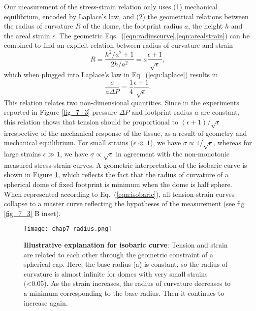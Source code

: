 Our measurement of the stress-strain relation only uses (1) mechanical equilibrium, encoded by Laplace's law, and (2) the geometrical relations between the radius of curvature $R$ of the dome, the footprint radius $a$, the height $h$ and the areal strain $\epsilon$. The geometric Eqs.~(\ref{eqn:radiuscurve},\ref{eqn:arealstrain}) can be combined to find an explicit relation between radius of curvature and strain
\begin{equation}
	R = \frac{h^2/a^2 + 1}{2h/a^2} = a\frac{\epsilon + 1}{\sqrt{\epsilon}},
\end{equation}
which when plugged into Laplace's law in Eq.~(\ref{eqn:laplace}) results in 
\begin{equation}
	\label{eqn:isobaric}
	\frac{\sigma}{a \Delta P} = \frac{1}{4}  \frac{\epsilon + 1}{\sqrt{\epsilon}}.
\end{equation}
This relation relates two non-dimensional quantities. Since in the experiments reported in Figure \ref{fig_7_3} pressure $\Delta P$ and footprint radius $a$ are constant, this relation shows that tension should be proportional to $(\epsilon + 1)/\sqrt{\epsilon}$ irrespective of the mechanical response of the tissue, as a result of geometry and mechanical equilibrium. For small strains ($\epsilon\ll 1$), we have $\sigma \propto 1/\sqrt{\epsilon}$, whereas for large strains $\epsilon\gg 1$, we have $\sigma \propto \sqrt{\epsilon}$ in agreement with the non-monotonic measured stress-strain curves. A geometric interpretation of the isobaric curve is shown in Figure \ref{fig_7_4}, which reflects the fact that the radius of curvature of a spherical dome of fixed footprint is minimum when the dome is half sphere. When represented according to Eq.~(\ref{eqn:isobaric}), all tension-strain curves collapse to a master curve reflecting the hypotheses of the measurement (see fig \ref{fig_7_3} B inset).

\begin{figure}
	\centering
	\texttt{[image: chap7\_radius.png]}
	\caption{\label{fig_7_4} \textbf{Illustrative explanation for isobaric curve}: Tension and strain are related to each other through the geometric constraint of a spherical cap. Here, the base radius (a) is constant, so the radius of curvature is almost infinite for domes with very small strains (<0.05). As the strain increases, the radius of curvature decreases to a minimum corresponding to the base radius. Then it continues to increase again.	
	}
\end{figure}

